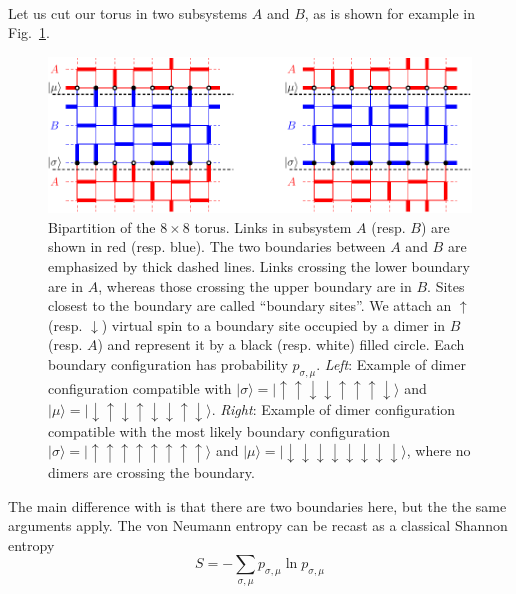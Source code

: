 \documentclass[11pt]{iopart}
\begin{document}
\paragraph{} Let us cut our torus in two subsystems $A$ and $B$, as is shown for example in Fig.~\ref{fig:bipartition}.
\begin{figure}[ht]
\begin{center}
\includegraphics{./figures/bipartition.pdf}
\end{center}
\caption{Bipartition of the $8\times 8$ torus. Links in subsystem $A$ (resp. $B$) are shown in red (resp. blue). The two boundaries between $A$ and $B$ are emphasized by thick dashed lines. Links crossing the lower boundary are in $A$, whereas those crossing the upper boundary are in $B$. Sites closest to the boundary are called ``boundary sites''. We attach an $\uparrow$ (resp. $\downarrow$) virtual spin to a boundary site occupied by a dimer in $B$ (resp. $A$) and represent it by a black (resp. white) filled circle. Each boundary configuration has probability $p_{\sigma,\mu}$. \emph{Left}: Example of dimer configuration compatible with $|\sigma\rangle=|\!\uparrow\uparrow\downarrow\downarrow\uparrow\uparrow\uparrow\downarrow\rangle$ and $|\mu\rangle=|\!\downarrow\uparrow\downarrow\uparrow\downarrow\downarrow\uparrow\downarrow\rangle$. \emph{Right}: Example of dimer configuration compatible with the most likely boundary configuration $|\sigma\rangle=|\!\uparrow\uparrow\uparrow\uparrow\uparrow\uparrow
\uparrow\uparrow\rangle$ and $|\mu\rangle=|\!\downarrow\downarrow\downarrow
\downarrow\downarrow\downarrow\downarrow\downarrow\rangle$, where no dimers are crossing the boundary.}
\label{fig:bipartition}
\end{figure}
The main difference with \cite{Shannonee} is that there are two boundaries here, but the the same arguments apply. The von Neumann entropy can be recast as a classical Shannon entropy
\begin{equation}
 S=-\sum_{\sigma,\mu} p_{\sigma,\mu} \ln p_{\sigma,\mu}
\end{equation}
\end{document}
